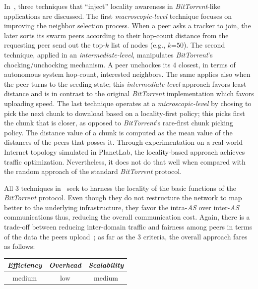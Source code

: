 In~\cite{LCLX2009}, three techniques that 
``inject'' locality awareness in {\sl BitTorrent}-like applications are discussed.
The first \emph{macroscopic-level} technique
focuses on improving the neighbor selection process. 
When a peer asks a tracker to join, 
the later sorts its swarm peers according to
their hop-count distance from the requesting peer 
send out the top-$k$ list of nodes (e.g., $k$=$50$).
The second technique, applied in an \emph{intermediate-level}, manipulates
{\sl BitTorrent}'s chocking/unchocking mechanism. A peer unchockes its $4$
closest, in terms of 
autonomous system hop-count, interested neighbors. 
The same applies also when the peer turns to 
the seeding state;  this  \emph{intermediate-level} approach favors
least distance and is in contrast to the original {\sl BitTorrent} 
implementation which favors uploading speed.
The last technique operates at a \emph{microscopic-level} by chosing to pick
the next chunk to download based on a locality-first policy; this picks first
the chunk that is closer, as opposed to {\sl BitTorrent}'s rare-first chunk
picking policy.
The distance value of a chunk is computed as the mean
value of the distances of the peers that posses it.
Through experimentation on a real-world Internet topology simulated in
{\sf PlanetLab}, the locality-based approach achieves traffic optimization.
Nevertheless, it does not do that well when compared with the
random approach of the standard {\sl BitTorrent} protocol.

All $3$ techniques in~\cite{LCLX2009} seek to harness 
the locality of the basic functions of the
{\sl BitTorrent} protocol. 
Even though they do not restructure the network to map
better to the underlying infrastructure, they favor the intra-\emph{AS} 
over inter-\emph{AS} communications thus, reducing the overall communication cost.
Again, there is a trade-off between reducing inter-domain
traffic and fairness among peers in terms of the data the peers upload~\cite{LCLX2009};
as far as the $3$ criteria, the overall approach fares as follows:
\begin{center}
{\footnotesize
\begin{tabular}{ccc}
\emph{Efficiency} & \emph{Overhead} & \emph{Scalability} \\
\hline
medium &
low &
medium
\end{tabular}
}
\end{center}

